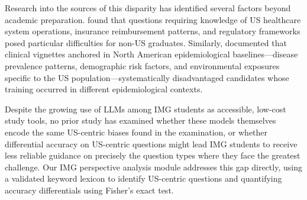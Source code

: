 Research into the sources of this disparity has identified several factors beyond academic preparation. \textcite{boulet2006} found that questions requiring knowledge of US healthcare system operations, insurance reimbursement patterns, and regulatory frameworks posed particular difficulties for non-US graduates. Similarly, \textcite{seelig2010img} documented that clinical vignettes anchored in North American epidemiological baselines—disease prevalence patterns, demographic risk factors, and environmental exposures specific to the US population—systematically disadvantaged candidates whose training occurred in different epidemiological contexts.

Despite the growing use of LLMs among IMG students as accessible, low-cost study tools, no prior study has examined whether these models themselves encode the same US-centric biases found in the examination, or whether differential accuracy on US-centric questions might lead IMG students to receive less reliable guidance on precisely the question types where they face the greatest challenge. Our IMG perspective analysis module addresses this gap directly, using a validated keyword lexicon to identify US-centric questions and quantifying accuracy differentials using Fisher's exact test.
